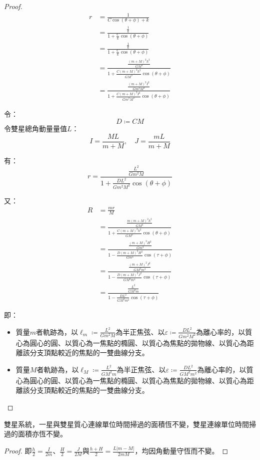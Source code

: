 \documentclass[a4paper,12pt]{article}
\begin{document}
\begin{proof}
\[\begin{aligned}
r&=\frac{1}{C\cos(\theta+\phi)+k}\\
&=\frac{\frac{1}{k}}{1+\frac{C}{k}\cos(\theta+\phi)}\\
&=\frac{\frac{1}{k}}{1+\frac{C}{k}\cos(\theta+\phi)}\\
&=\frac{\frac{(m+M)^2h^2}{GM^3}}{1+\frac{C(m+M)^2h^2}{GM^3}\cos(\theta+\phi)}\\
&=\frac{\frac{(m+M)^2I^2}{Gm^2M^3}}{1+\frac{C(m+M)^2I^2}{Gm^2M^3}\cos(\theta+\phi)}
\end{aligned}\]

令：
\[D\coloneq CM\]
令雙星總角動量量值$L$：
\[I=\frac{ML}{m+M},\quad J=\frac{mL}{m+M}\]

有：
\[r=\frac{\frac{L^2}{Gm^2M}}{1+\frac{DL^2}{Gm^2M^2}\cos(\theta+\phi)}\]

又：
\[\begin{aligned}
R&=\frac{mr}{M}\\
&=\frac{\frac{m(m+M)^2h^2}{GM^4}}{1+\frac{C(m+M)^2h^2}{GM^3}\cos(\theta+\phi)}\\
&=\frac{\frac{(m+M)^2H^2}{Gm^3}}{1-\frac{D(m+M)^2H^2}{Gm^4}\cos(\tau+\phi)}\\
&=\frac{\frac{(m+M)^2J^2}{GM^2m^3}}{1-\frac{D(m+M)^2J^2}{GM^2m^4}\cos(\tau+\phi)}\\
&=\frac{\frac{L^2}{GM^2m}}{1-\frac{DL^2}{GM^2m^2}\cos(\tau+\phi)}
\end{aligned}\]

即：
\begin{itemize}
\item 質量$m$者軌跡為，以$\ell_m\coloneq \frac{L^2}{Gm^2M}$為半正焦弦、以$\varepsilon\coloneq \frac{DL^2}{Gm^2M^2}$為離心率的，以質心為圓心的圓、以質心為一焦點的橢圓、以質心為焦點的拋物線、以質心為距離該分支頂點較近的焦點的一雙曲線分支。
\item 質量$M$者軌跡為，以$\ell_M\coloneq \frac{L^2}{GM^2m}$為半正焦弦、以$\varepsilon\coloneq \frac{DL^2}{GM^2m^2}$為離心率的，以質心為圓心的圓、以質心為一焦點的橢圓、以質心為焦點的拋物線、以質心為距離該分支頂點較近的焦點的一雙曲線分支。
\end{itemize}
\end{proof}
雙星系統，一星與雙星質心連線單位時間掃過的面積恆不變，雙星連線單位時間掃過的面積亦恆不變。
\begin{proof}
即$\frac{h}{2}=\frac{I}{2m}$、$\frac{H}{2}=\frac{J}{2M}$與$\frac{h+H}{2}=\frac{L|m-M|}{2mM}$，均因角動量守恆而不變。
\end{proof}
\end{document}
